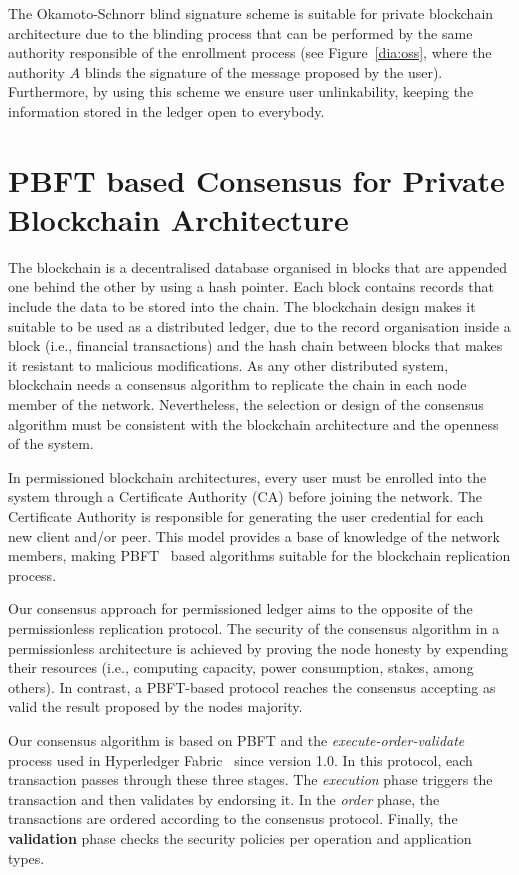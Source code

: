 \documentclass[conference]{llncs}
\begin{document}
The Okamoto-Schnorr blind signature scheme is suitable for private
blockchain architecture due to the blinding process that can be
performed by the same authority responsible of the enrollment process
(see Figure~\ref{dia:oss}, where the authority $A$ blinds the
signature of the message proposed by the user). Furthermore, by using
this scheme we  ensure  user unlinkability, keeping the information stored in the ledger open to everybody.

\section{PBFT based Consensus for Private Blockchain Architecture}
\label{PBFTHF}

The blockchain is a decentralised database organised in blocks that are appended one behind the other by using a hash pointer. Each block contains records that include the data to be stored into the chain. The blockchain design makes it suitable to be used as a distributed ledger, due to the record organisation inside a block (i.e., financial transactions) and the hash chain between blocks that makes it resistant to malicious modifications. As any other distributed system, blockchain needs a consensus algorithm to replicate the chain in each node member of the network. Nevertheless, the selection or design of the consensus algorithm must be consistent with the blockchain architecture and the openness of the system.

In permissioned blockchain architectures, every user must be enrolled into the system through a Certificate Authority (CA) before joining the network. The Certificate Authority is responsible for generating the user credential for each new client and/or peer. This model provides a base of knowledge of the network members, making PBFT~\cite{castro1999practical}  based algorithms suitable for the blockchain replication process.  

Our consensus approach for permissioned ledger aims to the opposite of
the permissionless replication protocol. The security of the consensus
algorithm in a permissionless architecture is achieved by proving the node honesty by expending their resources (i.e., computing capacity, power consumption, stakes, among others). In contrast, a PBFT-based protocol reaches the consensus accepting as valid the result proposed by the nodes majority. 

Our consensus algorithm is based on PBFT and the \textit{execute-order-validate} process used in Hyperledger Fabric~\cite{androulaki2018hyperledger} since version 1.0. In this protocol, each transaction passes through these three stages. The \textit{execution} phase triggers the transaction and then validates by endorsing it. In the \textit{order} phase, the transactions are ordered according to the consensus protocol. Finally, the \textbf{validation} phase checks the security policies per operation and application types.
\end{document}
